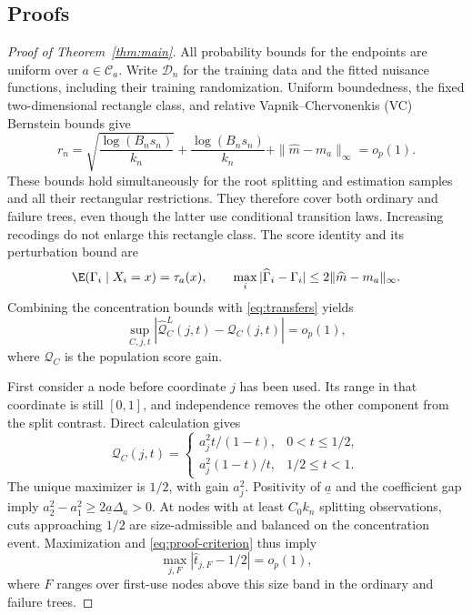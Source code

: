 \begin{appendix}

\section{Proofs}\label{app:proofs}

\begin{proof}[Proof of Theorem~\ref{thm:main}]
All probability bounds for the endpoints are uniform over \(a\in\mathcal C_a\).
Write \(\mathcal D_n\) for the training data and the fitted nuisance functions,
including their training randomization. Uniform boundedness, the fixed
two-dimensional rectangle class, and relative Vapnik--Chervonenkis (VC)
Bernstein bounds give
\[
r_n=\sqrt{\frac{\log(B_ns_n)}{k_n}}+
\frac{\log(B_ns_n)}{k_n}+
\|\widehat m-m_a\|_\infty=o_p(1).
\]
These bounds hold simultaneously for the root splitting and estimation
samples and all their rectangular restrictions. They therefore cover both
ordinary and failure trees, even though the latter use conditional transition
laws. Increasing recodings do not enlarge this rectangle class. The score
identity and its perturbation bound are
\[
\E(\Gamma_i\mid X_i=x)=\tau_a(x),
\qquad
\max_i|\widehat\Gamma_i-\Gamma_i|
\le2\|\widehat m-m_a\|_\infty.
\]
Combining the concentration bounds with \eqref{eq:transfers} yields
\begin{equation}\label{eq:proof-criterion}
\sup_{C,j,t}
\left|\widehat{\mathcal Q}^{L}_C(j,t)-\mathcal Q_C(j,t)\right|
=o_p(1),
\end{equation}
where \(\mathcal Q_C\) is the population score gain.

First consider a node before coordinate \(j\) has been used. Its range in
that coordinate is still \([0,1]\), and independence removes the other
component from the split contrast. Direct calculation gives
\begin{equation}\label{eq:proof-shape}
\mathcal Q_C(j,t)=
\begin{cases}
a_j^2t/(1-t),&0<t\le1/2,\\
a_j^2(1-t)/t,&1/2\le t<1.
\end{cases}
\end{equation}
The unique maximizer is \(1/2\), with gain \(a_j^2\). Positivity of
\(\underline a\) and the coefficient gap imply
\(a_2^2-a_1^2\ge2\underline a\Delta_a>0\).
At nodes with at least \(C_0k_n\) splitting observations, cuts approaching
\(1/2\) are size-admissible and balanced on the concentration event.
Maximization and \eqref{eq:proof-criterion} thus imply
\begin{equation}\label{eq:proof-localization}
\max_{j,F}|\widehat t_{j,F}-1/2|=o_p(1),
\end{equation}
where \(F\) ranges over first-use nodes above this size band in the ordinary
and failure trees.


\end{proof}
\end{appendix}
